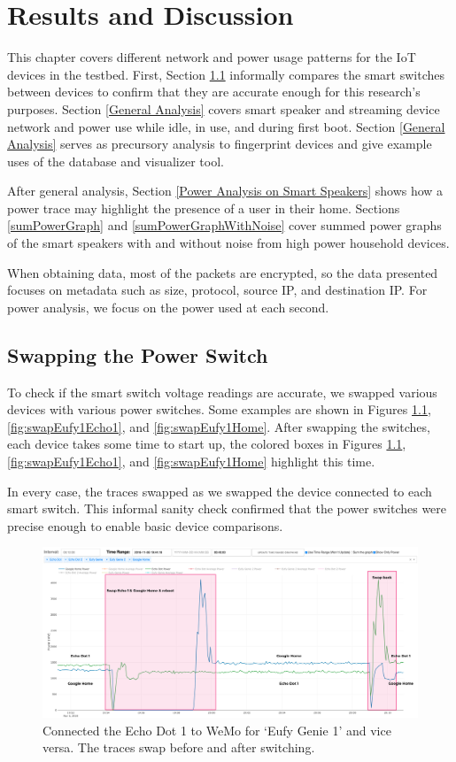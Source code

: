\chapter{Results and Discussion}
\label{Results}
This chapter covers different network and power usage patterns for the IoT devices in the testbed. First, Section \ref{swappingSwitch} informally compares the smart switches between devices to confirm that they are accurate enough for this research's purposes. Section \ref{General Analysis} covers smart speaker and streaming device network and power use while idle, in use, and during first boot. Section \ref{General Analysis} serves as precursory analysis to fingerprint devices and give example uses of the database and visualizer tool.

After general analysis, Section \ref{Power Analysis on Smart Speakers} shows how a power trace may highlight the presence of a user in their home. Sections \ref{sumPowerGraph} and \ref{sumPowerGraphWithNoise} cover summed power graphs of the smart speakers with and without noise from high power household devices.

When obtaining data, most of the packets are encrypted, so the data presented focuses on metadata such as size, protocol, source IP, and destination IP. For power analysis, we focus on the power used at each second.

\section{Swapping the Power Switch}
\label{swappingSwitch}
To check if the smart switch voltage readings are accurate, we swapped various devices with various power switches. Some examples are shown in Figures \ref{fig:swapEcho1Home}, \ref{fig:swapEufy1Echo1}, and \ref{fig:swapEufy1Home}. After swapping the switches, each device takes some time to start up, the colored boxes in Figures \ref{fig:swapEcho1Home}, \ref{fig:swapEufy1Echo1}, and \ref{fig:swapEufy1Home} highlight this time.

In every case, the traces swapped as we swapped the device connected to each smart switch. This informal sanity check confirmed that the power switches were precise enough to enable basic device comparisons.

\begin{figure}[H]
    \centering
    \includegraphics[width=1\textwidth]{figures/swapEcho1Home.png}
    \caption{Connected the Echo Dot 1 to WeMo for `Eufy Genie 1' and vice versa. The traces swap before and after switching.}
    \label{fig:swapEcho1Home}
\end{figure}

